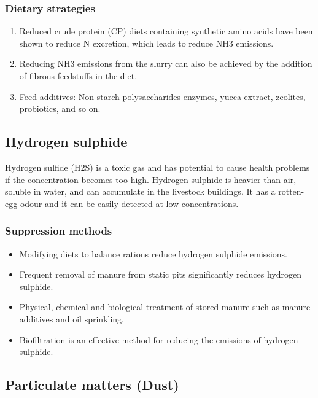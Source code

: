 \documentclass[]{book}
\providecommand{\tightlist}{%
  \setlength{\itemsep}{0pt}\setlength{\parskip}{0pt}}
\begin{document}
\subsubsection{Dietary strategies}\label{dietary-strategies}

\begin{enumerate}
\def\labelenumi{\arabic{enumi}.}
\tightlist
\item
  Reduced crude protein (CP) diets containing synthetic amino acids have
  been shown to reduce N excretion, which leads to reduce NH3 emissions.
\item
  Reducing NH3 emissions from the slurry can also be achieved by the
  addition of fibrous feedstuffs in the diet.
\item
  Feed additives: Non-starch polysaccharides enzymes, yucca extract,
  zeolites, probiotics, and so on.
\end{enumerate}

\subsection{Hydrogen sulphide}\label{hydrogen-sulphide}

Hydrogen sulfide (H2S) is a toxic gas and has potential to cause health
problems if the concentration becomes too high. Hydrogen sulphide is
heavier than air, soluble in water, and can accumulate in the livestock
buildings. It has a rotten-egg odour and it can be easily detected at
low concentrations.

\subsubsection{Suppression methods}\label{suppression-methods-1}

\begin{itemize}
\tightlist
\item
  Modifying diets to balance rations reduce hydrogen sulphide emissions.
\item
  Frequent removal of manure from static pits significantly reduces
  hydrogen sulphide.
\item
  Physical, chemical and biological treatment of stored manure such as
  manure additives and oil sprinkling.
\item
  Biofiltration is an effective method for reducing the emissions of
  hydrogen sulphide.
\end{itemize}

\subsection{Particulate matters (Dust)}\label{particulate-matters-dust}
\end{document}
